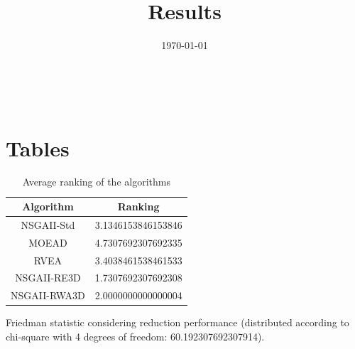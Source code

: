 \documentclass{article}
\title{Results}
\author{}
\date{\today}
\begin{document}
\oddsidemargin 0in \topmargin 0in\maketitle
\
\section{Tables}
\begin{table}[!htp]
\centering
\caption{Average ranking of the algorithms}
\begin{tabular}{c|c}
Algorithm&Ranking\\
\hline
NSGAII-Std&3.1346153846153846\\
MOEAD&4.7307692307692335\\
RVEA&3.4038461538461533\\
NSGAII-RE3D&1.7307692307692308\\
NSGAII-RWA3D&2.0000000000000004\\
\end{tabular}
\end{table}


Friedman statistic considering reduction performance (distributed according to chi-square with 4 degrees of freedom: 60.192307692307914).
\end{document}
